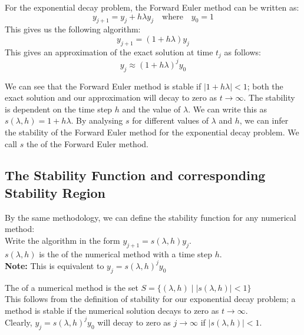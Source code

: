 \par For the exponential decay problem, the Forward Euler method can be written as:
\[ y_{j+1} = y_j + h \lambda y_j \quad \text{where} \quad y_0 = 1\]
This gives us the following algorithm:
\[ y_{j+1} = (1 + h \lambda) y_j\]
This gives an approximation of the exact solution at time $t_j$ as follows:
\[ y_{j} \approx {(1 + h \lambda)}^j y_0\]

\par We can see that the Forward Euler method is stable if $|1 + h \lambda| < 1$; both the exact solution and our approximation will decay to zero as $t \rightarrow \infty$.
The stability is dependent on the time step $h$ and the value of $\lambda$.
We can write this as $s(\lambda, h) = 1 + h \lambda$.
By analysing $s$ for different values of $\lambda$ and $h$, we can infer the stability of the Forward Euler method for the exponential decay problem.
We call $s$ the  of the Forward Euler method.



\subsection{The Stability Function and corresponding Stability Region}
\par By the same methodology, we can define the stability function for any numerical method:\\
Write the algorithm in the form $y_{j+1} = s(\lambda, h) y_{j}$.\\
$s(\lambda, h)$ is the  of the numerical method with a time step $h$.\\
\textbf{Note:} This is equivalent to $y_{j} = {s(\lambda,h)}^{j} y_0$

\par The  of a numerical method is the set $S = \Big\{ (\lambda, h) \;\Big|\; |s(\lambda, h)| < 1\Big\}$\\
This follows from the definition of stability for our exponential decay problem; a method is stable if the numerical solution decays to zero as $t \rightarrow \infty$.\\
Clearly, $y_{j} = {s(\lambda,h)}^{j} y_0$ will decay to zero as $j \rightarrow \infty$ if $|s(\lambda, h)| < 1$.

